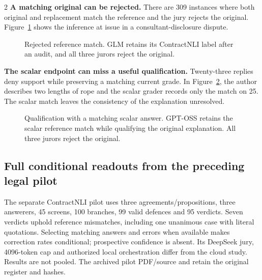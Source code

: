\begin{multicols}{2}
\textbf{A matching original can be rejected.} There are 309 instances where
both original and replacement match the reference and the jury rejects the
original. Figure~\ref{fig:trace-match-rejected} shows the inference at issue
in a consultant-disclosure dispute.
\begin{figure}[H]

 \caption{Rejected reference match. GLM retains its ContractNLI label after
 an audit, and all three jurors reject the original.}
 \label{fig:trace-match-rejected}
\end{figure}

\textbf{The scalar endpoint can miss a useful qualification.} Twenty-three
replies deny support while preserving a matching current grade. In
Figure~\ref{fig:trace-scalar-qualification}, the author describes two lengths
of rope and the scalar grader records only the match on 25.
The scalar match leaves the consistency of the explanation unresolved.
\begin{figure}[H]

 \caption{Qualification with a matching scalar answer. GPT-OSS retains the
 scalar reference match while qualifying the original explanation. All three
 jurors reject the original.}
 \label{fig:trace-scalar-qualification}
\end{figure}

\subsection{Full conditional readouts from the preceding legal pilot}
\label{app:diagnostic-pilot}
The separate ContractNLI pilot uses three agreements/propositions, three
answerers, 45 screens, 100 branches, 99 valid defences and 95 verdicts.
Seven verdicts uphold reference mismatches, including one unanimous case
with literal quotations. Selecting matching answers and errors when available
makes correction rates conditional; prospective confidence is absent.
Its DeepSeek jury, 4096-token cap and authorized local orchestration differ
from the cloud study. Results are not pooled. The archived pilot PDF/source
and  retain the original register and hashes.
\end{multicols}

